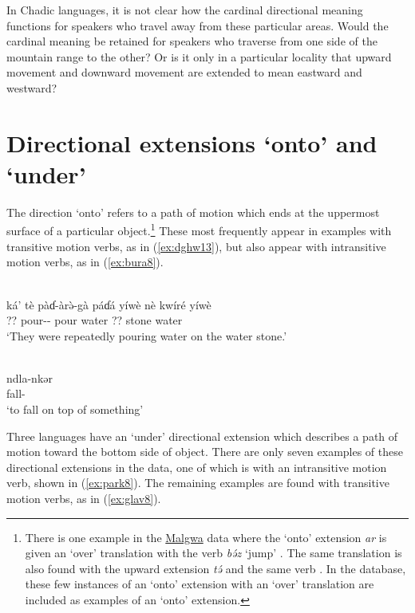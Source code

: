 In Chadic languages, it is not clear how the cardinal directional meaning functions for speakers who travel away from these particular areas. Would the cardinal meaning be retained for speakers who traverse from one side of the mountain range to the other? Or is it only in a particular locality that upward movement and downward movement are extended to mean eastward and westward? 

\section{Directional extensions `onto' and `under'}  \label{sec:onto1}

The direction `onto' refers to a path of motion which ends at the uppermost surface of a particular object.\footnote{There is one example in the \hyperref[malg]{Malgwa} data where the `onto' extension \textit{ar} is given an `over' translation with the verb \textit{bə́z} `jump' \citep[159]{lohrSpracheMalgwaNara2002}. The same translation is also found with the upward extension \textit{tə́} and the same verb \citep[162]{lohrSpracheMalgwaNara2002}. In the database, these few instances of an `onto' extension with an `over' translation are included as examples of an `onto' extension.}  These most frequently appear in examples with transitive motion verbs, as in (\ref{ex:dghw13}), but also appear with intransitive motion verbs, as in (\ref{ex:bura8}).  

\ea\label{ex:dghw13}
 \\
\gll ká' tè pàɗ-àrə̀-gà páɗá yíwè nè kwíré yíwè \\
 ?? pour-- pour water ?? stone water	\\
\glt `They were repeatedly pouring water on the water stone.'

\ex\label{ex:bura8}
 \\
\gll ndla-nkər \\
fall- \\
\glt `to fall on top of something'
\z 

Three languages have an `under' directional extension which describes a path of motion toward the bottom side of object. There are only seven examples of these directional extensions in the data, one of which is with an intransitive motion verb, shown in (\ref{ex:park8}). The remaining examples are found with transitive motion verbs, as in (\ref{ex:glav8}).

